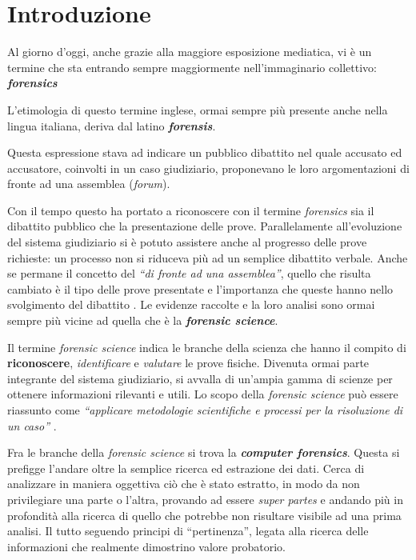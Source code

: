 
\chapter{Introduzione}

Al giorno d'oggi, anche grazie alla maggiore esposizione mediatica, vi è un termine che sta entrando sempre maggiormente nell'immaginario collettivo: \textit{\textbf{forensics}}

L'etimologia di questo termine inglese, ormai sempre più presente anche nella lingua italiana, deriva dal latino \textbf{\textit{forensis}}. 

Questa espressione stava ad indicare un pubblico dibattito nel quale accusato ed accusatore, coinvolti in un caso giudiziario, proponevano le loro argomentazioni di fronte ad una assemblea (\textit{forum}). 

Con il tempo questo ha portato a riconoscere con il termine \textit{forensics} sia il dibattito pubblico che la presentazione delle prove. Parallelamente all'evoluzione del sistema giudiziario si è potuto assistere anche al progresso delle prove richieste: un processo non si riduceva più ad un semplice dibattito verbale. Anche se permane il concetto del \textit{``di fronte ad una assemblea''}, quello che risulta cambiato è il tipo delle prove presentate e l'importanza che queste hanno nello svolgimento del dibattito \cite{Noctis}. Le evidenze raccolte e la loro analisi sono ormai sempre più vicine ad quella che è la \textbf{\textit{forensic science}}. 

Il termine \textit{forensic science} indica le branche della scienza che hanno il compito di \textbf{riconoscere}, \textit{identificare} e \textit{valutare} le prove fisiche. Divenuta ormai parte integrante del sistema giudiziario, si avvalla di un'ampia gamma di scienze per ottenere informazioni rilevanti e utili. Lo scopo della \textit{forensic science} può essere riassunto come \textit{``applicare metodologie scientifiche e processi per la risoluzione di un caso''} \cite{Forensics}.

Fra le branche della \textit{forensic science} si trova la \textbf{\textit{computer forensics}}. Questa si prefigge l'andare oltre la semplice ricerca ed estrazione dei dati. Cerca di analizzare in maniera oggettiva ciò che è stato estratto, in modo da non privilegiare una parte o l'altra, provando ad essere \textit{super partes} e andando più in profondità alla ricerca di quello che potrebbe non risultare visibile ad una prima analisi. Il tutto seguendo principi di ``pertinenza'', legata alla ricerca delle informazioni che realmente dimostrino valore probatorio.

